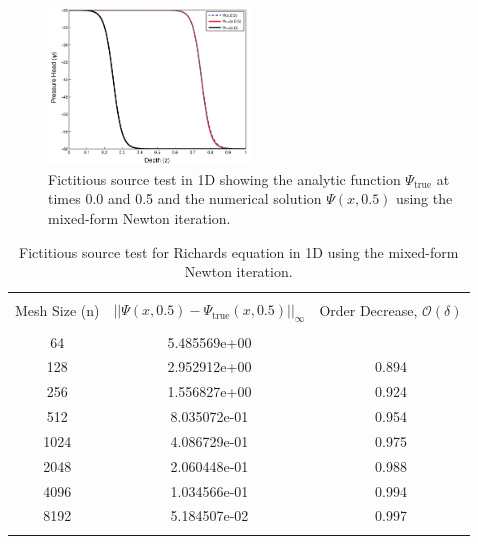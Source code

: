 \documentclass[preprint,review,3p,times,onecolumn,authoryear]{elsarticle}
\begin{document}
\begin{figure}[!ht]
\begin{center}
\includegraphics[width=0.48\textwidth]{source.png}
\end{center}
\caption{Fictitious source test in 1D showing the analytic function $\Psi_{\text{true}}$ at times 0.0 and 0.5 and the numerical solution $\Psi(x,0.5)$ using the mixed-form Newton iteration.}
\label{fig:richards-validation-source}
\end{figure}

\begin{table}[!ht]
\centering
\caption{Fictitious source test for Richards equation in 1D using the mixed-form Newton iteration.}
\begin{tabular}{*{3}{c}}
\\[-0.5em]
\hline
\\[-0.5em]
Mesh Size (n)    &     $||\Psi(x,0.5) - \Psi_{\text{true}}(x,0.5)||_\infty$     &    Order Decrease, $\mathcal{O}(\delta)$ \\[0.5em]
\hline
\\[-0.5em]
           64    &    5.485569e+00    &                    \\
          128    &    2.952912e+00    &             0.894  \\
          256    &    1.556827e+00    &             0.924  \\
          512    &    8.035072e-01    &             0.954  \\
         1024    &    4.086729e-01    &             0.975  \\
         2048    &    2.060448e-01    &             0.988  \\
         4096    &    1.034566e-01    &             0.994  \\
         8192    &    5.184507e-02    &             0.997  \\

\\[-0.5em]
\hline
\end{tabular}
\label{table:richards-source}
\end{table}
\end{document}
